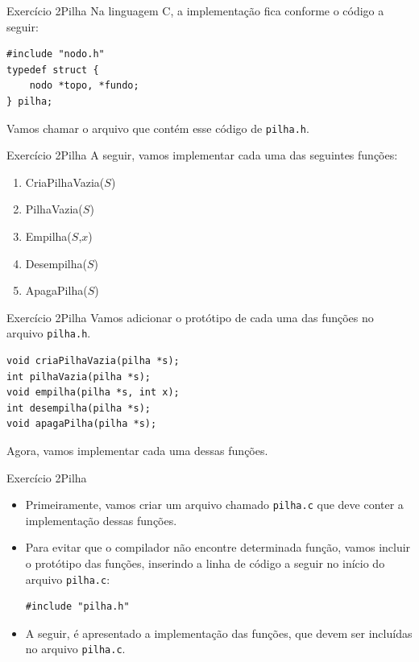 \documentclass[aspectratio=169]{beamer}
\begin{document}
\begin{frame}[fragile]{Exercício 2}{Pilha}
Na linguagem C, a implementação fica conforme o código a seguir:
\begin{lstlisting}[style=CStyle]
#include "nodo.h"
typedef struct {
    nodo *topo, *fundo;
} pilha;
\end{lstlisting}  
Vamos chamar o arquivo que contém esse código de \verb|pilha.h|.
\end{frame}


\begin{frame}[fragile]{Exercício 2}{Pilha}
A seguir, vamos implementar cada uma das seguintes funções:
\begin{enumerate}
 \item CriaPilhaVazia($S$) 
 \item PilhaVazia($S$)
 \item Empilha($S$,$x$)
 \item Desempilha($S$) 
 \item ApagaPilha($S$)
\end{enumerate}
\end{frame}


\begin{frame}[fragile]{Exercício 2}{Pilha}
Vamos adicionar o protótipo de cada uma das funções no arquivo \verb|pilha.h|.
\begin{lstlisting}[style=CStyle]
void criaPilhaVazia(pilha *s);
int pilhaVazia(pilha *s);
void empilha(pilha *s, int x);
int desempilha(pilha *s);
void apagaPilha(pilha *s);
\end{lstlisting}  
Agora, vamos implementar cada uma dessas funções. 
\end{frame}


\begin{frame}[fragile]{Exercício 2}{Pilha}
\begin{itemize}
\item Primeiramente, vamos criar um arquivo chamado \verb|pilha.c| que deve conter a implementação dessas funções.
\item Para evitar que o compilador não encontre determinada função, vamos incluir o protótipo das funções, inserindo a linha de código a seguir no início do arquivo \verb|pilha.c|:
\begin{lstlisting}[style=CStyle]
#include "pilha.h"
\end{lstlisting}  
\item A seguir, é apresentado a implementação das funções, que devem ser incluídas no arquivo \verb|pilha.c|.
\end{itemize}
\end{frame}
\end{document}
